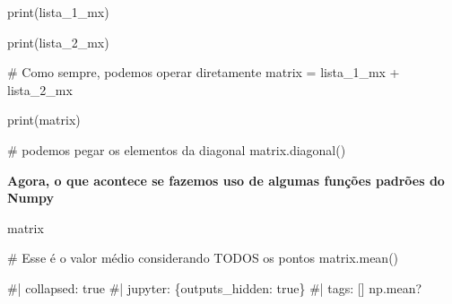 \documentclass[
  letterpaper,
  DIV=11,
  numbers=noendperiod]{scrreprt}
\newenvironment{Shaded}{\begin{snugshade}}{\end{snugshade}}
\newcommand{\NormalTok}[1]{\textcolor[rgb]{0.00,0.23,0.31}{#1}}
\begin{document}
\begin{Shaded}
\begin{Highlighting}[]
\NormalTok{print(lista\_1\_mx)}
\end{Highlighting}
\end{Shaded}

\begin{Shaded}
\begin{Highlighting}[]
\NormalTok{print(lista\_2\_mx)}
\end{Highlighting}
\end{Shaded}

\begin{Shaded}
\begin{Highlighting}[]
\NormalTok{\# Como sempre, podemos operar diretamente}
\NormalTok{matrix = lista\_1\_mx + lista\_2\_mx}
\end{Highlighting}
\end{Shaded}

\begin{Shaded}
\begin{Highlighting}[]
\NormalTok{print(matrix)}
\end{Highlighting}
\end{Shaded}

\begin{Shaded}
\begin{Highlighting}[]
\NormalTok{\# podemos pegar os elementos da diagonal}
\NormalTok{matrix.diagonal()}
\end{Highlighting}
\end{Shaded}

\textbf{Agora, o que acontece se fazemos uso de algumas funções padrões
do Numpy}

\begin{Shaded}
\begin{Highlighting}[]
\NormalTok{matrix}
\end{Highlighting}
\end{Shaded}

\begin{Shaded}
\begin{Highlighting}[]
\NormalTok{\# Esse é o valor médio considerando TODOS os pontos}
\NormalTok{matrix.mean()}
\end{Highlighting}
\end{Shaded}

\begin{Shaded}
\begin{Highlighting}[]
\NormalTok{\#| collapsed: true}
\NormalTok{\#| jupyter: \{outputs\_hidden: true\}}
\NormalTok{\#| tags: []}
\NormalTok{np.mean?}
\end{Highlighting}
\end{Shaded}
\end{document}
